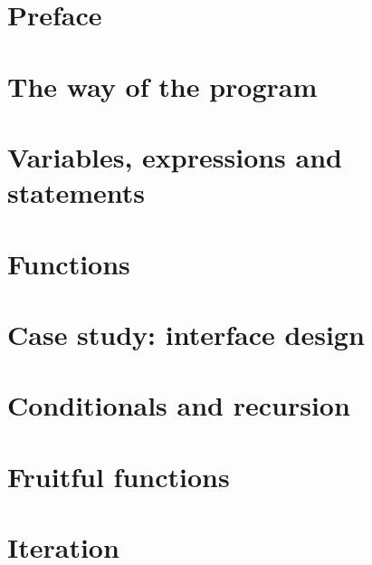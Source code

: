 \documentclass[10pt]{book}
\newcommand{\EN}{\color{red} \normalsize}
\newcommand{\UN}{\color{black}\normalsize}
\begin{document}

\EN

\EN
\chapter{Preface}


\UN
\begin{latexonly}

\tableofcontents

\clearemptydoublepage

\end{latexonly}

\mainmatter

\EN
\chapter{The way of the program}

\EN
\chapter{Variables, expressions and statements}

\EN
\chapter{Functions}

\EN
\chapter{Case study: interface design}
\label{turtlechap}

\EN
\chapter{Conditionals and recursion}

\EN
\chapter{Fruitful functions}
\label{fruitchap}

\EN
\chapter{Iteration}

\EN
\end{document}
